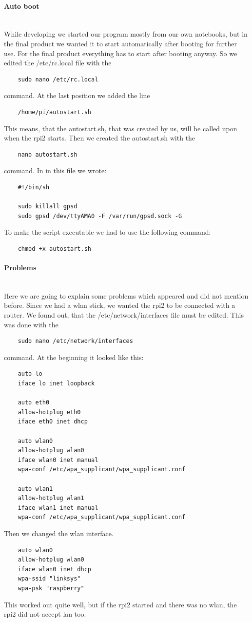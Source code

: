 \paragraph{Auto boot} \mbox{}\\
While developing we started our program mostly from our own notebooks, but in the final product we wanted it to start automatically after booting for further use. For the final product everything has to start after booting anyway. So we edited the /etc/rc.local file with the 
\begin{verbatim}
	sudo nano /etc/rc.local
\end{verbatim} 
command. At the last position we added the line
\begin{verbatim}
	/home/pi/autostart.sh 
\end{verbatim} 
This means, that the autostart.sh, that was created by us, will be called upon when the \gls{rpi2} starts. Then we created the autostart.sh with the 
\begin{verbatim}
	nano autostart.sh
\end{verbatim}
command. In in this file we wrote:
\begin{verbatim}
	#!/bin/sh

	sudo killall gpsd
	sudo gpsd /dev/ttyAMA0 -F /var/run/gpsd.sock -G
\end{verbatim}
To make the script executable we had to use the following command:
\begin{verbatim}
	chmod +x autostart.sh
\end{verbatim}
\paragraph{Problems} \mbox{}\\
Here we are going to explain some problems which appeared and did not mention before.\newline
Since we had a \gls{wlan} stick, we wanted the \gls{rpi2} to be connected with a router. We found out, that the /etc/network/interfaces file must be edited. This was done with the
\begin{verbatim}
	sudo nano /etc/network/interfaces 
\end{verbatim}
command.\newline
At the beginning it looked like this:
\begin{verbatim}
	auto lo
	iface lo inet loopback

	auto eth0
	allow-hotplug eth0
	iface eth0 inet dhcp

	auto wlan0
	allow-hotplug wlan0
	iface wlan0 inet manual
	wpa-conf /etc/wpa_supplicant/wpa_supplicant.conf

	auto wlan1
	allow-hotplug wlan1
	iface wlan1 inet manual
	wpa-conf /etc/wpa_supplicant/wpa_supplicant.conf
\end{verbatim}
Then we changed the \gls{wlan} interface.
\begin{verbatim}
	auto wlan0
	allow-hotplug wlan0
	iface wlan0 inet dhcp
	wpa-ssid "linksys"
	wpa-psk "raspberry"
\end{verbatim}
This worked out quite well, but if the \gls{rpi2} started and there was no \gls{wlan}, the \gls{rpi2} did not accept \gls{lan} too.
\newpage
